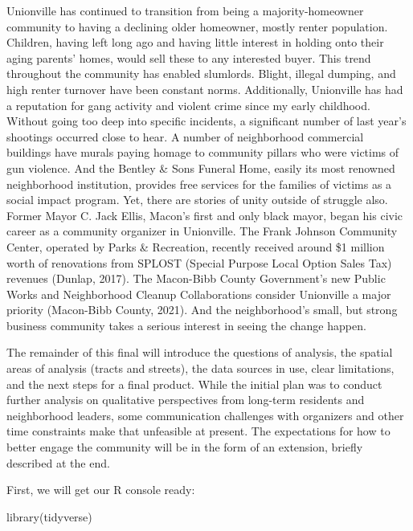\documentclass[
]{article}
\newenvironment{Shaded}{\begin{snugshade}}{\end{snugshade}}
\newcommand{\FunctionTok}[1]{\textcolor[rgb]{0.00,0.00,0.00}{#1}}
\newcommand{\NormalTok}[1]{#1}
\begin{document}
Unionville has continued to transition from being a majority-homeowner
community to having a declining older homeowner, mostly renter
population. Children, having left long ago and having little interest in
holding onto their aging parents' homes, would sell these to any
interested buyer. This trend throughout the community has enabled
slumlords. Blight, illegal dumping, and high renter turnover have been
constant norms. Additionally, Unionville has had a reputation for gang
activity and violent crime since my early childhood. Without going too
deep into specific incidents, a significant number of last year's
shootings occurred close to hear. A number of neighborhood commercial
buildings have murals paying homage to community pillars who were
victims of gun violence. And the Bentley \& Sons Funeral Home, easily
its most renowned neighborhood institution, provides free services for
the families of victims as a social impact program. Yet, there are
stories of unity outside of struggle also. Former Mayor C. Jack Ellis,
Macon's first and only black mayor, began his civic career as a
community organizer in Unionville. The Frank Johnson Community Center,
operated by Parks \& Recreation, recently received around \$1 million
worth of renovations from SPLOST (Special Purpose Local Option Sales
Tax) revenues (Dunlap, 2017). The Macon-Bibb County Government's new
Public Works and Neighborhood Cleanup Collaborations consider Unionville
a major priority (Macon-Bibb County, 2021). And the neighborhood's
small, but strong business community takes a serious interest in seeing
the change happen.

The remainder of this final will introduce the questions of analysis,
the spatial areas of analysis (tracts and streets), the data sources in
use, clear limitations, and the next steps for a final product. While
the initial plan was to conduct further analysis on qualitative
perspectives from long-term residents and neighborhood leaders, some
communication challenges with organizers and other time constraints make
that unfeasible at present. The expectations for how to better engage
the community will be in the form of an extension, briefly described at
the end.

First, we will get our R console ready:

\begin{Shaded}
\begin{Highlighting}[]
 \FunctionTok{library}\NormalTok{(tidyverse)}
\end{Highlighting}
\end{Shaded}
\end{document}
